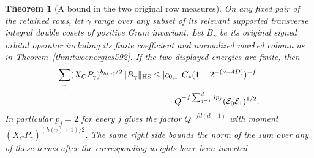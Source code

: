 \documentclass[a4paper,11pt]{article}
\newtheorem{theorem}[proposition]{Theorem}
\theoremstyle{definition}
\theoremstyle{remark}
\numberwithin{equation}{section}
\begin{document}
\begin{theorem}[A bound in the two original row measures]
\leavevmode\label{thm:pivotintegral619}
On any fixed pair of the retained rows, let \(\gamma\) range over
any subset of its relevant supported transverse integral double
cosets of positive Gram invariant. Let \(B_\gamma\) be its original
signed orbital operator including its finite coefficient and
normalized marked column as in Theorem~\ref{thm:twoenergies592}.
If the two displayed energies are finite, then
\begin{align*}
 \sum_\gamma (X_C P_\gamma)^{b_{h(\gamma)}/2}
                   \|B_\gamma\|_{\rm HS}
 &\le |c_{0,1}|\,C_*(1-2^{-(\nu-4D)})^{-f}\\
 &\qquad{}\cdot Q^{-f\sum_{j=1}^d j p_j}
                 (\mathcal E_0\mathcal E_1)^{1/2}.
\end{align*}
In particular \(p_j=2\) for every \(j\) gives the factor
\(Q^{-fd(d+1)}\) with moment \((X_C P_\gamma)^{(h(\gamma)+1)/2}\).
The same right side bounds the norm of the sum over any of these
terms after the corresponding weights have been inserted.
\end{theorem}
\end{document}
